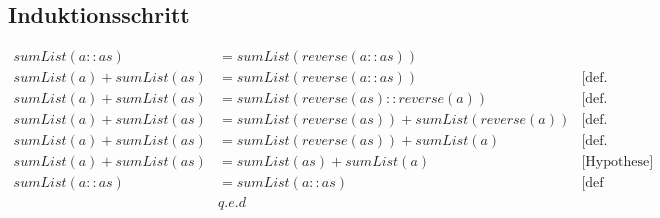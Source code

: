 \documentclass[12pt,runningheads,a4paper]{llncs}
\begin{document}
\subsection*{Induktionsschritt}
\begin{align*}
sumList(a::as) &= sumList(reverse(a::as))\\
sumList(a) + sumList(as) &=  sumList(reverse(a::as)) & \text{[def. sumList]}\\
sumList(a) + sumList(as) &= sumList(reverse(as)::reverse(a)) & \text{[def. reverse]}\\
sumList(a) + sumList(as) &= sumList(reverse(as)) + sumList(reverse(a)) & \text{[def. sumList]}\\
sumList(a) + sumList(as) &= sumList(reverse(as)) + sumList(a) & \text{[def. reverse]}\\
sumList(a) + sumList(as) &= sumList(as) + sumList(a) & \text{[Hypothese]}\\
sumList(a::as) &= sumList(a::as) & \text{[def sumList]}\\
&q.e.d
\end{align*}
\end{document}
